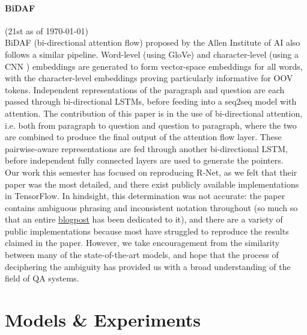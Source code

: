 \documentclass{article}
\begin{document}
\paragraph{BiDAF} (21st as of \today) \\
BiDAF (bi-directional attention flow) \cite{BiDAF} proposed by the Allen Institute of AI also follows a similar pipeline. Word-level (using GloVe) and character-level (using a CNN \cite{Kim}) embeddings are generated to form vector-space embeddings for all words, with the character-level embeddings proving particularly informative for OOV tokens. Independent representations of the paragraph and question are each passed through bi-directional LSTMs, before feeding into a seq2seq model with attention. The contribution of this paper is in the use of bi-directional attention, i.e. both from paragraph to question and question to paragraph, where the two are combined to produce the final output of the attention flow layer. These pairwise-aware representations are fed through another bi-directional LSTM, before independent fully connected layers are used to generate the pointers. \\ 

Our work this semester has focused on reproducing R-Net, as we felt that their paper was the most detailed, and there exist publicly available implementations in TensorFlow. In hindsight, this determination was not accurate: the paper contains ambiguous phrasing and inconsistent notation throughout (so much so that an entire \href{https://yerevann.github.io/2017/08/25/challenges-of-reproducing-r-net-neural-network-using-keras/}{blogpost} has been dedicated to it), and there are a variety of public implementations because most have struggled to reproduce the results claimed in the paper. However, we take encouragement from the similarity between many of the state-of-the-art models, and hope that the process of deciphering the ambiguity has provided us with a broad understanding of the field of QA systems.

\section{Models \& Experiments} \label{model}
\end{document}
